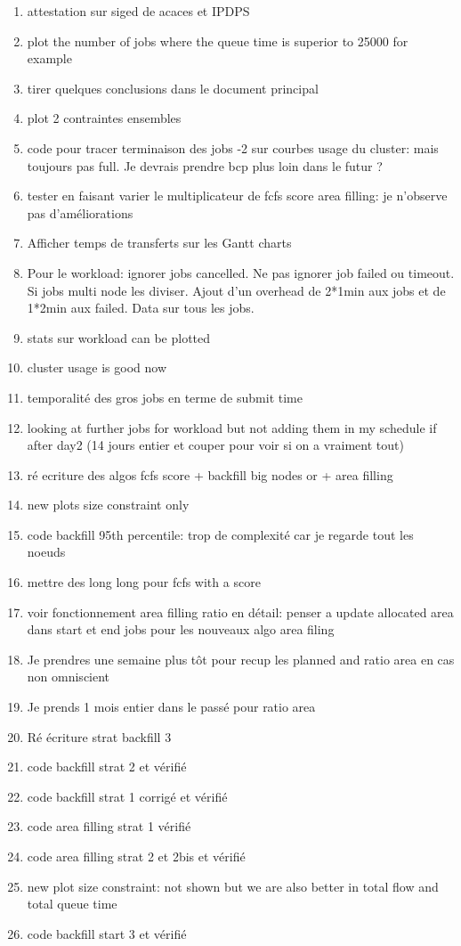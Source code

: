 \documentclass[a4paper]{article}
\begin{document}
\begin{enumerate}
		\item attestation sur siged de acaces et IPDPS
		\item plot the number of jobs where the queue time is superior to 25000 for example
		\item tirer quelques conclusions dans le document principal
		\item plot 2 contraintes ensembles
		\item code pour tracer terminaison des jobs -2 sur courbes usage du cluster: mais toujours pas full. Je devrais prendre bcp plus loin dans le futur ?
		\item tester en faisant varier le multiplicateur de fcfs score area filling: je n'observe pas d'améliorations
		\item Afficher temps de transferts sur les Gantt charts
		
		\item Pour le workload: ignorer jobs cancelled. Ne pas ignorer job failed ou timeout. Si jobs multi node les diviser. Ajout d'un overhead de 2*1min aux jobs et de 1*2min aux failed. Data sur tous les jobs.
		\item stats sur workload can be plotted
		\item cluster usage is good now
		\item temporalité des gros jobs en terme de submit time
		\item looking at further jobs for workload but not adding them in my schedule if after day2 (14 jours entier et couper pour voir si on a vraiment tout)
		\item ré ecriture des algos fcfs score + backfill big nodes or + area filling
		\item new plots size constraint only
		\item code backfill 95th percentile: trop de complexité car je regarde tout les noeuds

		\item mettre des long long pour fcfs with a score
		\item voir fonctionnement area filling ratio en détail: penser a update allocated area dans start et end jobs pour les nouveaux algo area filing
		\item Je prendres une semaine plus tôt pour recup les planned and ratio area en cas non omniscient
		\item Je prends 1 mois entier dans le passé pour ratio area
		\item Ré écriture strat backfill 3
		\item code backfill strat 2 et vérifié
		\item code backfill strat 1 corrigé et vérifié
		\item code area filling strat 1 vérifié
		\item code area filling strat 2 et 2bis et vérifié
		\item new plot size constraint: not shown but we are also better in total flow and total queue time
		\item code backfill start 3 et vérifié
	\end{enumerate}
	
\end{document}
